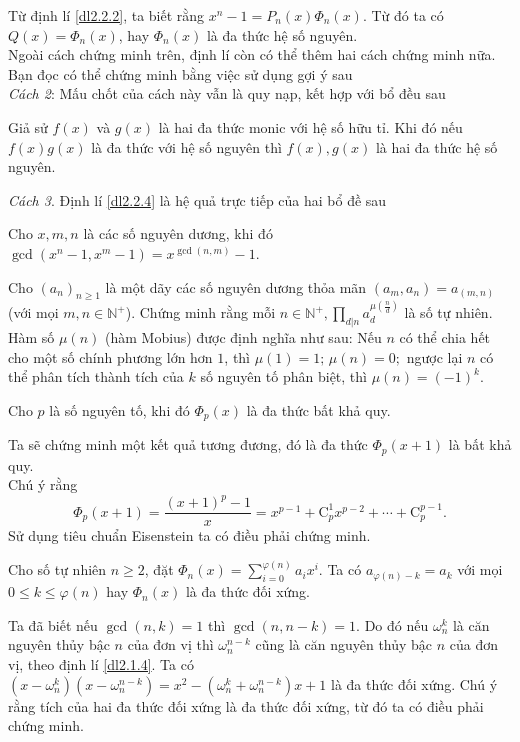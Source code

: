 Từ định lí \eqref{dl2.2.2}, ta biết rằng $x^n-1=P_n(x)\Phi_n(x)$. Từ đó ta có $Q(x)=\Phi_n(x)$, hay $\Phi_n(x)$ là đa thức hệ số nguyên.\\
Ngoài cách chứng minh trên, định lí còn có thể thêm hai cách chứng minh nữa. Bạn đọc có thể chứng minh bằng việc sử dụng gợi ý sau\\
\textit{Cách 2}: Mấu chốt của cách này vẫn là quy nạp, kết hợp với bổ đều sau
\begin{bode}\label{bode2.2.5}
	Giả sử $f(x)$ và $g(x)$ là hai đa thức monic với hệ số hữu tỉ. Khi đó nếu $f(x)g(x)$ là đa thức với hệ số nguyên thì $f(x), g(x)$ là hai đa thức hệ số nguyên.
\end{bode}
\textit{Cách 3}. Định lí \eqref{dl2.2.4} là hệ quả trực tiếp của hai bổ đề sau
\begin{bode}
	Cho $x,m,n$ là các số nguyên dương, khi đó $\gcd(x^n-1,x^m-1)=x^{\gcd(n,m)}-1$.
\end{bode}
\begin{bode}
	Cho $(a_n)_{n\ge 1}$ là một dãy các số nguyên dương thỏa mãn $(a_m,a_n)=a_{(m,n)}$ (với mọi $m,n\in \mathbb{N}^+$). Chứng minh rằng mỗi $n\in \mathbb{N}^+, \displaystyle\prod _{d|n}a_d^{\mu(\frac{n}{d})}$ là số tự nhiên. Hàm số $\mu (n)$ (hàm Mobius) được định nghĩa như sau: Nếu $n$  có thể chia hết cho một số chính phương lớn hơn $1$, thì $\mu (1)=1;\, \mu (n)=0;$ ngược lại $n$ có thể phân tích thành tích của $k$ số nguyên tố phân biệt, thì $\mu(n)=(-1)^k$.
\end{bode}
\begin{dl}\label{dl2.2.8}
	Cho $p$ là số nguyên tố, khi đó $\Phi_p(x)$ là đa thức bất khả quy.
\end{dl}
 Ta sẽ chứng minh một kết quả tương đương, đó là đa thức $\Phi_p(x+1)$ là bất khả quy.\\
Chú ý rằng $$\Phi_p(x+1)=\dfrac{(x+1)^p-1}{x}=x^{p-1}+\mathrm{C}^1_p x^{p-2}+\cdots + \mathrm{C}^{p-1}_p.$$
Sử dụng tiêu chuẩn Eisenstein ta có điều phải chứng minh.
\begin{dl}\label{dl2.2.9}
	Cho số tự nhiên $n\ge 2$, đặt $\Phi_n(x)=\displaystyle\sum\limits_{i=0}^{\varphi (n)}a_ix^i$. Ta có $a_{\varphi(n)-k}=a_k$ với mọi $0\le k\le \varphi(n)$ hay $\Phi_n(x)$ là đa thức đối xứng.
\end{dl}
  Ta đã biết nếu $\gcd(n,k)=1$ thì $\gcd(n, n-k)=1$. Do đó nếu $\omega_n^k$ là căn nguyên thủy bậc $n$ của đơn vị thì $\omega_n^{n-k}$ cũng là căn nguyên thủy bậc $n$ của đơn vị, theo định lí \eqref{dl2.1.4}. Ta có $(x-\omega_n^k)(x-\omega_n^{n-k})=x^2-(\omega_n^k+\omega_n^{n-k})x+1$ là đa thức đối xứng. Chú ý rằng tích của hai đa thức đối xứng là đa thức đối xứng, từ đó ta có điều phải chứng minh.\\
